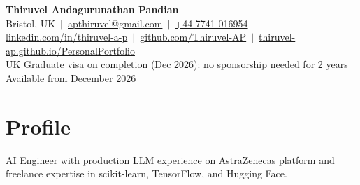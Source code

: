 \documentclass[a4paper,10pt]{article}
\begin{document}
\fontsize{10.5}{12.6}\selectfont

\begin{center}
  {\LARGE\bfseries Thiruvel Andagurunathan Pandian}\\[3pt]
  Bristol, UK \,$|$\, \href{mailto:apthiruvel@gmail.com}{apthiruvel@gmail.com} \,$|$\, \href{tel:+447741016954}{+44 7741 016954}\\[1pt]
\href{https://www.linkedin.com/in/thiruvel-a-p/}{linkedin.com/in/thiruvel-a-p} \,$|$\, \href{https://github.com/Thiruvel-AP}{github.com/Thiruvel-AP} \,$|$\, \href{https://thiruvel-ap.github.io/PersonalPortfolio/}{thiruvel-ap.github.io/PersonalPortfolio}\\[1pt]
  UK Graduate visa on completion (Dec 2026): no sponsorship needed for 2 years \,$|$\, Available from December 2026
\end{center}

\section{Profile}
AI Engineer with production LLM experience on AstraZeneca\textquotesingle{}s platform and freelance expertise in scikit-learn, TensorFlow, and Hugging Face.

\end{document}
